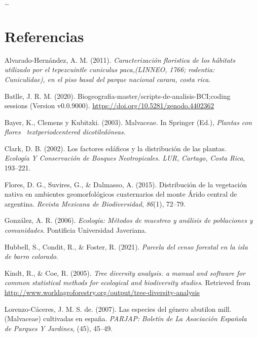 \documentclass[11pt,]{article}
\begin{document}
\ldots

\section*{Referencias}\label{referencias}

\hypertarget{refs}{}
\hypertarget{ref-alvarado2011caracterizacion}{}
Alvarado-Hernández, A. M. (2011). \emph{Caracterización floristica de
los hábitats utilizado por el tepezcuintle cuniculus paca,(LINNEO, 1766;
rodentia: Cuniculidae), en el piso basal del parque nacional carara,
costa rica}.

\hypertarget{ref-jose_ramon_martinez_batlle_2020_4402362}{}
Batlle, J. R. M. (2020).
Biogeografia-master/scripts-de-analisis-BCI;coding sessions (Version
v0.0.9000). \url{https://doi.org/10.5281/zenodo.4402362}

\hypertarget{ref-bayer2003malvaceae}{}
Bayer, K., Clemens y Kubitzki. (2003). Malvaceae. In Springer (Ed.),
\emph{Plantas con flores ~textperiodcentered dicotiledóneas}.

\hypertarget{ref-clark2002factores}{}
Clark, D. B. (2002). Los factores edáficos y la distribución de las
plantas. \emph{Ecología Y Conservación de Bosques Neotropicales. LUR,
Cartago, Costa Rica}, 193--221.

\hypertarget{ref-flores2015distribucion}{}
Flores, D. G., Suvires, G., \& Dalmasso, A. (2015). Distribución de la
vegetación nativa en ambientes geomorfológicos cuaternarios del monte
Árido central de argentina. \emph{Revista Mexicana de Biodiversidad},
\emph{86}(1), 72--79.

\hypertarget{ref-gonzalez2006ecologia}{}
González, A. R. (2006). \emph{Ecología: Métodos de muestreo y análisis
de poblaciones y comunidades}. Pontificia Universidad Javeriana.

\hypertarget{ref-webcenso}{}
Hubbell, S., Condit, R., \& Foster, R. (2021). \emph{Parcela del censo
forestal en la isla de barro colorado}.

\hypertarget{ref-biodiversidad}{}
Kindt, R., \& Coe, R. (2005). \emph{Tree diversity analysis. a manual
and software for common statistical methods for ecological and
biodiversity studies}. Retrieved from
\url{http://www.worldagroforestry.org/output/tree-diversity-analysis}

\hypertarget{ref-de2007especies}{}
Lorenzo-Cáceres, J. M. S. de. (2007). Las especies del género abutilon
mill.(Malvaceae) cultivadas en españa. \emph{PARJAP: Boletín de La
Asociación Española de Parques Y Jardines}, (45), 45--49.
\end{document}
